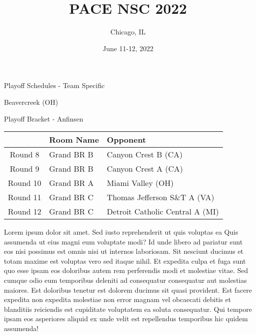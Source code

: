 \documentclass{article}%
\title{PACE NSC 2022}%
\author{Chicago, IL}%
\date{June 11{-}12, 2022}%
\begin{document}
%
\normalsize%
%
\maketitle%
\vspace*{48pt}%
\begin{center}%
\begin{Huge}%
Playoff Schedules {-} Team Specific%
\end{Huge}%
\end{center}%
\newpage%
\begin{center}%
\begin{Huge}%
Beavercreek (OH)%
\end{Huge}%
\vspace*{8pt}%
\linebreak%
\begin{Large}%
Playoff Bracket {-} Anfinsen%
\end{Large}%
\end{center}%
\begin{tabularx}{\textwidth}{|c|Y|Y|}%
\hline%
&Room Name&Opponent\\%
\hline%
Round 8&Grand BR B&Canyon Crest B (CA)\\%
Round 9&Grand BR B&Canyon Crest A (CA)\\%
Round 10&Grand BR A&Miami Valley (OH)\\%
Round 11&Grand BR C&Thomas Jefferson S\&T A (VA)\\%
Round 12&Grand BR C&Detroit Catholic Central A (MI)\\%
\hline%
\end{tabularx}%
\vspace*{8pt}%
\linebreak%
\newline%
\newline%
Lorem ipsum dolor sit amet. Sed iusto reprehenderit ut quis voluptas ea Quis assumenda ut eius magni eum voluptate modi? Id unde libero ad pariatur sunt eos nisi possimus est omnis nisi ut internos laboriosam. Sit nesciunt ducimus et totam maxime est voluptas vero sed itaque nihil. Et expedita culpa et fuga sunt quo esse ipsam eos doloribus autem rem perferendis modi et molestiae vitae.\newline%
\newline%
Sed cumque odio eum temporibus deleniti ad consequatur consequatur aut molestias maiores. Est doloribus tenetur est dolorem ducimus sit quasi provident. Est facere expedita non expedita molestiae non error magnam vel obcaecati debitis et blanditiis reiciendis est cupiditate voluptatem ea soluta consequatur. Qui tempore ipsam eos asperiores aliquid ex unde velit est repellendus temporibus hic quidem assumenda!\newline%
\end{document}
